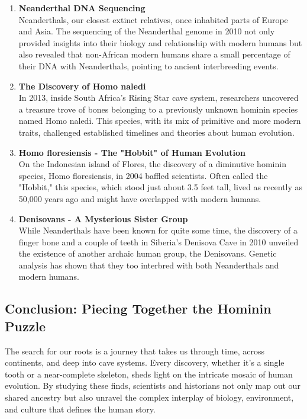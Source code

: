 \documentclass[a4paper,12pt]{book}
\begin{document}
\begin{enumerate}
    \item \textbf{Neanderthal DNA Sequencing} \\
    Neanderthals, our closest extinct relatives, once inhabited parts of Europe and Asia. The sequencing of the Neanderthal genome in 2010 not only provided insights into their biology and relationship with modern humans but also revealed that non-African modern humans share a small percentage of their DNA with Neanderthals, pointing to ancient interbreeding events.

    \item \textbf{The Discovery of Homo naledi} \\
    In 2013, inside South Africa's Rising Star cave system, researchers uncovered a treasure trove of bones belonging to a previously unknown hominin species named Homo naledi. This species, with its mix of primitive and more modern traits, challenged established timelines and theories about human evolution.

    \item \textbf{Homo floresiensis - The "Hobbit" of Human Evolution} \\
    On the Indonesian island of Flores, the discovery of a diminutive hominin species, Homo floresiensis, in 2004 baffled scientists. Often called the "Hobbit," this species, which stood just about 3.5 feet tall, lived as recently as 50,000 years ago and might have overlapped with modern humans.

    \item \textbf{Denisovans - A Mysterious Sister Group} \\
    While Neanderthals have been known for quite some time, the discovery of a finger bone and a couple of teeth in Siberia's Denisova Cave in 2010 unveiled the existence of another archaic human group, the Denisovans. Genetic analysis has shown that they too interbred with both Neanderthals and modern humans.
\end{enumerate}

\subsection*{Conclusion: Piecing Together the Hominin Puzzle}
The search for our roots is a journey that takes us through time, across continents, and deep into cave systems. Every discovery, whether it's a single tooth or a near-complete skeleton, sheds light on the intricate mosaic of human evolution. By studying these finds, scientists and historians not only map out our shared ancestry but also unravel the complex interplay of biology, environment, and culture that defines the human story.
\end{document}
